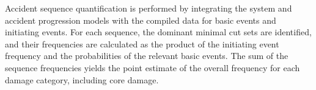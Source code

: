 Accident sequence quantification is performed by integrating the system and accident progression models with the compiled data for basic events and initiating events. For each sequence, the dominant minimal cut sets are identified, and their frequencies are calculated as the product of the initiating event frequency and the probabilities of the relevant basic events. The sum of the sequence frequencies yields the point estimate of the overall frequency for each damage category, including core damage.


